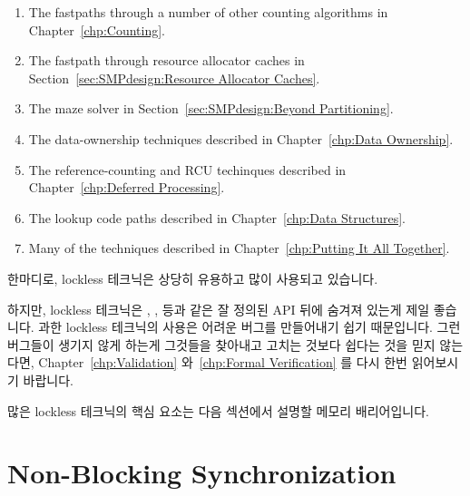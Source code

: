 \begin{enumerate}
\item	The fastpaths through a number of other counting algorithms
	in Chapter~\ref{chp:Counting}.
\item	The fastpath through resource allocator caches in
	Section~\ref{sec:SMPdesign:Resource Allocator Caches}.
\item	The maze solver in Section~\ref{sec:SMPdesign:Beyond Partitioning}.
\item	The data-ownership techniques described in
	Chapter~\ref{chp:Data Ownership}.
\item	The reference-counting and RCU techinques described in
	Chapter~\ref{chp:Deferred Processing}.
\item	The lookup code paths described in Chapter~\ref{chp:Data Structures}.
\item	Many of the techniques described in
	Chapter~\ref{chp:Putting It All Together}.
\end{enumerate}
\fi

한마디로, lockless 테크닉은 상당히 유용하고 많이 사용되고 있습니다.

하지만, lockless 테크닉은 , ,
 등과 같은 잘 정의된 API 뒤에 숨겨져 있는게 제일 좋습니다.
과한 lockless 테크닉의 사용은 어려운 버그를 만들어내기 쉽기 때문입니다.
그런 버그들이 생기지 않게 하는게 그것들을 찾아내고 고치는 것보다 쉽다는 것을
믿지 않는다면,
Chapter~\ref{chp:Validation} 와~\ref{chp:Formal Verification} 를 다시 한번
읽어보시기 바랍니다.

많은 lockless 테크닉의 핵심 요소는 다음 섹션에서 설명할 메모리 배리어입니다.
\iffalse

In short, lockless techniques are quite useful and are heavily used.

However, it is best if lockless techniques are hidden behind a
well-defined API, such as the \co{inc_count()}, \co{memblock_alloc()},
\co{rcu_read_lock()}, and so on.
The reason for this is that undisciplined use of lockless techniques
is a good way to create difficult bugs.
If you don't believe that avoiding such bugs is easier than finding
and fixing them, please re-read
Chapters~\ref{chp:Validation} and~\ref{chp:Formal Verification}.

A key component of many lockless techniques is the memory barrier,
which is described in the following section.
\fi

\section{Non-Blocking Synchronization}
\label{sec:advsync:Non-Blocking Synchronization}

